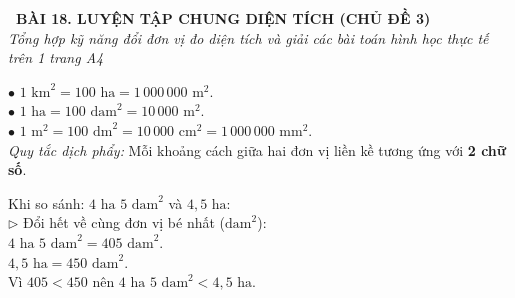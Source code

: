 \documentclass[14pt,a4paper,oneside]{extbook}
\begin{document}
\noindent
\begin{tcolorbox}[
  enhanced,
  colback=teal!8!white,
  colframe=teal!80!black,
  arc=3mm,
  boxrule=1.1pt,
  width=\linewidth,
  halign=center,
  top=2.2mm, bottom=2.2mm,
  left=3mm, right=3mm,
  drop fuzzy shadow
]
  {\large\bfseries\color{teal!95!black}\faBookmark\ BÀI 18. LUYỆN TẬP CHUNG DIỆN TÍCH (CHỦ ĐỀ 3)}\\[2pt]
  {\scriptsize\color{black!75}\itshape Tổng hợp kỹ năng đổi đơn vị đo diện tích và giải các bài toán hình học thực tế trên 1 trang A4}
\end{tcolorbox}

\vspace{3.2mm}
\noindent
\begin{minipage}[t]{0.54\textwidth}
  \begin{tcolorbox}[
    enhanced,
    title={\footnotesize\bfseries\color{white}\faExchange\ 1. Ma trận chuyển đổi đơn vị diện tích},
    colback=blue!2!white,
    colframe=blue!75!black,
    arc=2.5mm, boxrule=0.8pt, top=1.8mm, bottom=1.8mm, left=2.2mm, right=2.2mm
  ]
    \footnotesize
    $\bullet$ $1\text{ km}^2 = 100\text{ ha} = 1\,000\,000\text{ m}^2$.\\
    $\bullet$ $1\text{ ha} = 100\text{ dam}^2 = 10\,000\text{ m}^2$.\\
    $\bullet$ $1\text{ m}^2 = 100\text{ dm}^2 = 10\,000\text{ cm}^2 = 1\,000\,000\text{ mm}^2$.\\
    \textit{Quy tắc dịch phẩy:} Mỗi khoảng cách giữa hai đơn vị liền kề tương ứng với \textbf{2 chữ số}.
  \end{tcolorbox}
\end{minipage}%
\hfill
\begin{minipage}[t]{0.44\textwidth}
  \begin{tcolorbox}[
    enhanced,
    title={\footnotesize\bfseries\color{white}\faCheckSquareO\ 2. So sánh các số đo diện tích},
    colback=teal!2!white,
    colframe=teal!75!black,
    arc=2.5mm, boxrule=0.8pt, top=1.8mm, bottom=1.8mm, left=2mm, right=2mm
  ]
    \footnotesize
    Khi so sánh: $4\text{ ha } 5\text{ dam}^2$ và $4,5\text{ ha}$:\\
    $\triangleright$ Đổi hết về cùng đơn vị bé nhất ($\text{dam}^2$):\\
    \quad $4\text{ ha } 5\text{ dam}^2 = 405\text{ dam}^2$.\\
    \quad $4,5\text{ ha} = 450\text{ dam}^2$.\\
    Vì $405 < 450$ nên $4\text{ ha } 5\text{ dam}^2 < 4,5\text{ ha}$.
  \end{tcolorbox}
\end{minipage}
\end{document}
